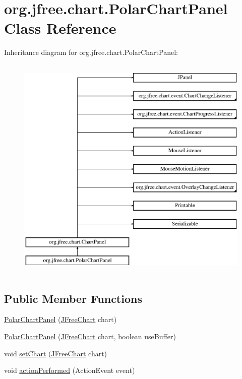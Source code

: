 \hypertarget{classorg_1_1jfree_1_1chart_1_1_polar_chart_panel}{}\section{org.\+jfree.\+chart.\+Polar\+Chart\+Panel Class Reference}
\label{classorg_1_1jfree_1_1chart_1_1_polar_chart_panel}
Inheritance diagram for org.\+jfree.\+chart.\+Polar\+Chart\+Panel\+:\begin{figure}[H]
\begin{center}
\leavevmode
\includegraphics[height=11.000000cm]{classorg_1_1jfree_1_1chart_1_1_polar_chart_panel}
\end{center}
\end{figure}
\subsection*{Public Member Functions}
\begin{DoxyCompactItemize}
\item 
\mbox{\hyperlink{classorg_1_1jfree_1_1chart_1_1_polar_chart_panel_affe082b9529d4d4e808571a5686bc15d}{Polar\+Chart\+Panel}} (\mbox{\hyperlink{classorg_1_1jfree_1_1chart_1_1_j_free_chart}{J\+Free\+Chart}} chart)
\item 
\mbox{\hyperlink{classorg_1_1jfree_1_1chart_1_1_polar_chart_panel_ace2ecd3fcbe1db16de9c22dd604b7bc4}{Polar\+Chart\+Panel}} (\mbox{\hyperlink{classorg_1_1jfree_1_1chart_1_1_j_free_chart}{J\+Free\+Chart}} chart, boolean use\+Buffer)
\item 
void \mbox{\hyperlink{classorg_1_1jfree_1_1chart_1_1_polar_chart_panel_a9524f88a2900f8c3c553fddee253d387}{set\+Chart}} (\mbox{\hyperlink{classorg_1_1jfree_1_1chart_1_1_j_free_chart}{J\+Free\+Chart}} chart)
\item 
void \mbox{\hyperlink{classorg_1_1jfree_1_1chart_1_1_polar_chart_panel_af50cd0752b6bdb126951243f258f63b8}{action\+Performed}} (Action\+Event event)
\end{DoxyCompactItemize}

